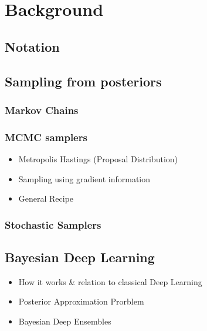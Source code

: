 \section{Background}\label{chap:background}

\subsection{Notation}

\subsection{Sampling from posteriors}

\subsubsection{Markov Chains}

\subsubsection{MCMC samplers}
\begin{itemize}
    \item Metropolis Hastings (Proposal Distribution)
    \item Sampling using gradient information
    \item General Recipe
\end{itemize}

\subsubsection{Stochastic Samplers}

\subsection{Bayesian Deep Learning}

\begin{itemize}
    \item How it works \& relation to classical Deep Learning
    \item Posterior Approximation Prorblem
    \item Bayesian Deep Ensembles
\end{itemize}

\newpage
